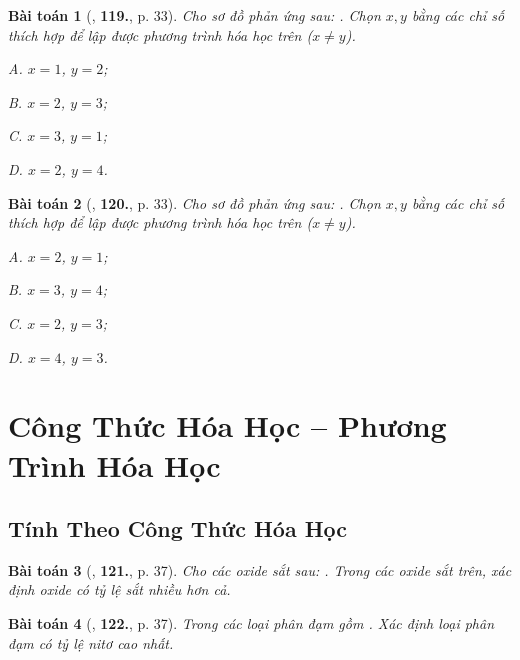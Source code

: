 \documentclass{article}
\numberwithin{equation}{section}
\newtheorem{baitoan}{Bài toán}[section]
\begin{document}
\begin{baitoan}[\cite{An2011}, \textbf{119.}, p. 33]
	Cho sơ đồ phản ứng sau: \emph{}. Chọn $x,y$ bằng các chỉ số thích hợp để lập được phương trình hóa học trên ($x\ne y$).
	\begin{enumerate*}
		\item[{\rm\sf A.}] $x = 1$, $y = 2$;
		\item[{\rm\sf B.}] $x = 2$, $y = 3$;
		\item[{\rm\sf C.}] $x = 3$, $y = 1$;
		\item[{\rm\sf D.}] $x = 2$, $y = 4$.
	\end{enumerate*}
\end{baitoan}

\begin{baitoan}[\cite{An2011}, \textbf{120.}, p. 33]
	Cho sơ đồ phản ứng sau: \emph{}. Chọn $x,y$ bằng các chỉ số thích hợp để lập được phương trình hóa học trên ($x\ne y$).
	\begin{enumerate*}
		\item[{\rm\sf A.}] $x = 2$, $y = 1$;
		\item[{\rm\sf B.}] $x = 3$, $y = 4$;
		\item[{\rm\sf C.}] $x = 2$, $y = 3$;
		\item[{\rm\sf D.}] $x = 4$, $y = 3$.
	\end{enumerate*}
\end{baitoan}


\section{Công Thức Hóa Học -- Phương Trình Hóa Học}

\subsection{Tính Theo Công Thức Hóa Học}

\begin{baitoan}[\cite{An2011}, \textbf{121.}, p. 37]
	Cho các oxide sắt sau: . Trong các oxide sắt trên, xác định oxide có tỷ lệ sắt nhiều hơn cả.
\end{baitoan}

\begin{baitoan}[\cite{An2011}, \textbf{122.}, p. 37]
	Trong các loại phân đạm gồm . Xác định loại phân đạm có tỷ lệ nitơ cao nhất.
\end{baitoan}
\end{document}
